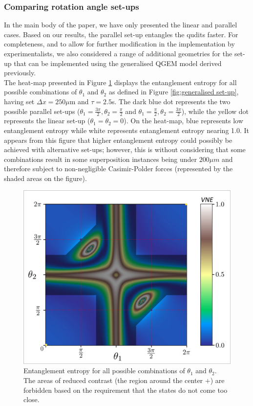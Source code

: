 \documentclass[%
 12pt,
 superscriptaddress,
 amsmath,
 amssymb,
 onecolumn,
 longbibliography
]{revtex4-2}
\begin{document}
\begin{appendices}
\subsubsection{Comparing rotation angle set-ups\label{sec:angles}}

\indent In the main body of the paper, we have only presented the linear and parallel cases. Based on our results, the parallel set-up entangles the qudits faster. For completeness, and to allow for further modification in the implementation by experimentalists, we also considered a range of additional geometries for the set-up that can be implemented using the generalised QGEM model derived previously. \\
\indent The heat-map presented in Figure \ref{heatmap2} displays the entanglement entropy for all possible combinations of $\theta_1$ and $\theta_2$ as defined in Figure \ref{fig:generalised set-up}, having set $\Delta x = 250\mu$m and $\tau = 2.5$s. The dark blue dot represents the two possible parallel set-ups ($\theta_1 = \frac{3\pi}{2}, \theta_2=\frac{\pi}{2}$ and $\theta_1 = \frac{\pi}{2}, \theta_2=\frac{3\pi}{2}$), while the yellow dot represents the linear set-up ($\theta_1 = \theta_2 = 0$). On the heat-map, blue represents low entanglement entropy while white represents entanglement entropy nearing 1.0. It appears from this figure that higher entanglement entropy could possibly be achieved with alternative set-ups; however, this is without considering that some combinations result in some superposition instances being under $200 \mu m$ and therefore subject to non-negligible Casimir-Polder forces (represented by the shaded areas on the figure).
	\begin{figure}
	\centering
	    \includegraphics[width=0.5\columnwidth]{heatmap_VNE_angles_grays.png}\par\medskip
	    \caption{Entanglement entropy for all possible combinations of $\theta_1$ and $\theta_2$. The areas of reduced contrast (the region around the center $+$) are forbidden based on the requirement that the states do not come too close.}\label{heatmap2}
	\end{figure}


\end{appendices}
\end{document}

